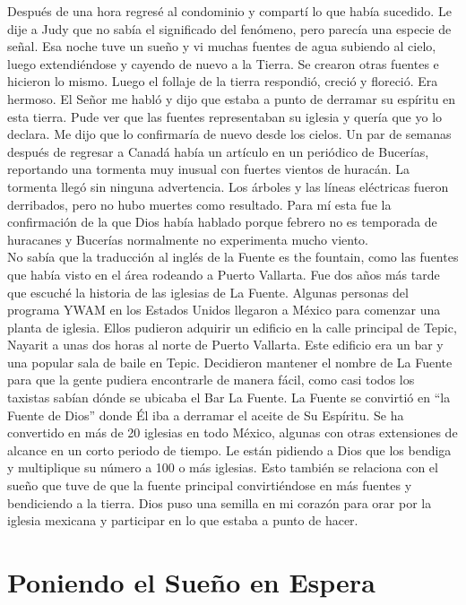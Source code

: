 \documentclass[twoside, 12pt]{book}
\begin{document}
Después de una hora regresé al condominio y compartí lo que había sucedido. Le dije a Judy que no sabía el significado del fenómeno, pero parecía una especie de señal. Esa noche tuve un sueño y vi muchas fuentes de agua subiendo al cielo, luego extendiéndose y cayendo de nuevo a la Tierra. Se crearon otras fuentes e hicieron lo mismo. Luego el follaje de la tierra respondió, creció y floreció. Era hermoso. El Señor me habló y dijo que estaba a punto de derramar su espíritu en esta tierra. Pude ver que las fuentes representaban su iglesia y quería que yo lo declara. Me dijo que lo confirmaría de nuevo desde los cielos. Un par de semanas después de regresar a Canadá había un artículo en un periódico de Bucerías, reportando una tormenta muy inusual con fuertes vientos de huracán. La tormenta llegó sin ninguna advertencia. Los árboles y las líneas eléctricas fueron derribados, pero no hubo muertes como resultado. Para mí esta fue la confirmación de la que Dios había hablado porque febrero no es temporada de huracanes y Bucerías normalmente no experimenta mucho viento.\\
 
No sabía que la traducción al inglés de la Fuente es the fountain, como las fuentes que había visto en el área rodeando a Puerto Vallarta. Fue dos años más tarde que escuché la historia de las iglesias de La Fuente. Algunas personas del programa YWAM en los Estados Unidos llegaron a México para comenzar una planta de iglesia. Ellos pudieron adquirir un edificio en la calle principal de Tepic, Nayarit a unas dos horas al norte de Puerto Vallarta. Este edificio era un bar y una popular sala de baile en Tepic. Decidieron mantener el nombre de La Fuente para que la gente pudiera encontrarle de manera fácil, como casi todos los taxistas sabían dónde se ubicaba el Bar La Fuente. La Fuente se convirtió en “la Fuente de Dios” donde Él iba a derramar el aceite de Su Espíritu.  Se ha convertido en más de 20 iglesias en todo México, algunas con otras extensiones de alcance en un corto periodo de tiempo. Le están pidiendo a Dios que los bendiga y multiplique su número a 100 o más iglesias. Esto también se relaciona con el sueño que tuve de que la fuente principal convirtiéndose en más fuentes y bendiciendo a la tierra. Dios puso una semilla en mi corazón para orar por la iglesia mexicana y participar en lo que estaba a punto de hacer.\\
 



\section{Poniendo el Sueño en Espera}
 
\end{document}
